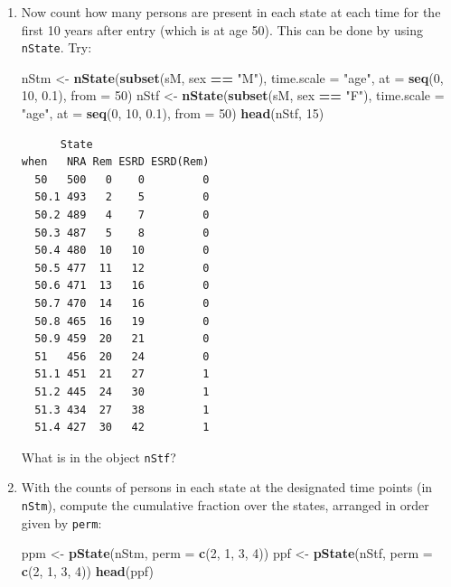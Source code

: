 \documentclass[
]{book}
\newenvironment{Shaded}{\begin{snugshade}}{\end{snugshade}}
\newcommand{\AttributeTok}[1]{\textcolor[rgb]{0.13,0.29,0.53}{#1}}
\newcommand{\DecValTok}[1]{\textcolor[rgb]{0.00,0.00,0.81}{#1}}
\newcommand{\FloatTok}[1]{\textcolor[rgb]{0.00,0.00,0.81}{#1}}
\newcommand{\FunctionTok}[1]{\textcolor[rgb]{0.13,0.29,0.53}{\textbf{#1}}}
\newcommand{\NormalTok}[1]{#1}
\newcommand{\OtherTok}[1]{\textcolor[rgb]{0.56,0.35,0.01}{#1}}
\newcommand{\SpecialCharTok}[1]{\textcolor[rgb]{0.81,0.36,0.00}{\textbf{#1}}}
\newcommand{\StringTok}[1]{\textcolor[rgb]{0.31,0.60,0.02}{#1}}
\begin{document}
\begin{enumerate}
  Why are there so many ESRD-events in the resulting data set?
\item
  Now count how many persons are present in each state
  at each time for the first 10 years after entry (which is at age 50). This
  can be done by using \texttt{nState}. Try:

\begin{Shaded}
\begin{Highlighting}[]
\NormalTok{nStm }\OtherTok{\textless{}{-}} \FunctionTok{nState}\NormalTok{(}\FunctionTok{subset}\NormalTok{(sM, sex }\SpecialCharTok{==} \StringTok{"M"}\NormalTok{), }\AttributeTok{time.scale =} \StringTok{"age"}\NormalTok{, }
               \AttributeTok{at =} \FunctionTok{seq}\NormalTok{(}\DecValTok{0}\NormalTok{, }\DecValTok{10}\NormalTok{, }\FloatTok{0.1}\NormalTok{), }
             \AttributeTok{from =} \DecValTok{50}\NormalTok{)}
\NormalTok{nStf }\OtherTok{\textless{}{-}} \FunctionTok{nState}\NormalTok{(}\FunctionTok{subset}\NormalTok{(sM, sex }\SpecialCharTok{==} \StringTok{"F"}\NormalTok{), }\AttributeTok{time.scale =} \StringTok{"age"}\NormalTok{, }
               \AttributeTok{at =} \FunctionTok{seq}\NormalTok{(}\DecValTok{0}\NormalTok{, }\DecValTok{10}\NormalTok{, }\FloatTok{0.1}\NormalTok{), }
             \AttributeTok{from =} \DecValTok{50}\NormalTok{)}
\FunctionTok{head}\NormalTok{(nStf, }\DecValTok{15}\NormalTok{)}
\end{Highlighting}
\end{Shaded}

\begin{verbatim}
      State
when   NRA Rem ESRD ESRD(Rem)
  50   500   0    0         0
  50.1 493   2    5         0
  50.2 489   4    7         0
  50.3 487   5    8         0
  50.4 480  10   10         0
  50.5 477  11   12         0
  50.6 471  13   16         0
  50.7 470  14   16         0
  50.8 465  16   19         0
  50.9 459  20   21         0
  51   456  20   24         0
  51.1 451  21   27         1
  51.2 445  24   30         1
  51.3 434  27   38         1
  51.4 427  30   42         1
\end{verbatim}

  What is in the object \texttt{nStf}?
\item
  With the counts of persons in each state at the
  designated time points (in \texttt{nStm}), compute the cumulative
  fraction over the states, arranged in order given by \texttt{perm}:

\begin{Shaded}
\begin{Highlighting}[]
\NormalTok{ppm }\OtherTok{\textless{}{-}} \FunctionTok{pState}\NormalTok{(nStm, }\AttributeTok{perm =} \FunctionTok{c}\NormalTok{(}\DecValTok{2}\NormalTok{, }\DecValTok{1}\NormalTok{, }\DecValTok{3}\NormalTok{, }\DecValTok{4}\NormalTok{))}
\NormalTok{ppf }\OtherTok{\textless{}{-}} \FunctionTok{pState}\NormalTok{(nStf, }\AttributeTok{perm =} \FunctionTok{c}\NormalTok{(}\DecValTok{2}\NormalTok{, }\DecValTok{1}\NormalTok{, }\DecValTok{3}\NormalTok{, }\DecValTok{4}\NormalTok{))}
\FunctionTok{head}\NormalTok{(ppf)}
\end{Highlighting}
\end{Shaded}


\end{enumerate}
\end{document}
